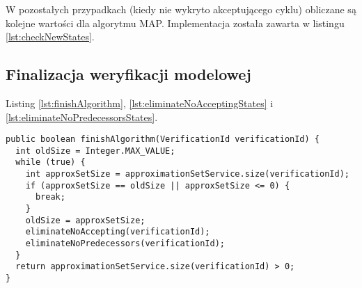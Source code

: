 W pozostałych przypadkach (kiedy nie wykryto akceptującego cyklu) obliczane są kolejne wartości dla algorytmu MAP. Implementacja została zawarta w listingu \ref{lst:checkNewStates}.


\subsection{Finalizacja weryfikacji modelowej}

Listing \ref{lst:finishAlgorithm}, \ref{lst:eliminateNoAcceptingStates} i \ref{lst:eliminateNoPredecessorsStates}.

\begin{minipage}{\linewidth}
\begin{lstlisting}[caption={Kod obsługujący algorytm w przypadku, gdy nie zakończy się wcześniej.},captionpos=b,label={lst:finishAlgorithm}]
public boolean finishAlgorithm(VerificationId verificationId) {
  int oldSize = Integer.MAX_VALUE;
  while (true) {
    int approxSetSize = approximationSetService.size(verificationId);
    if (approxSetSize == oldSize || approxSetSize <= 0) {
      break;
    }
    oldSize = approxSetSize;
    eliminateNoAccepting(verificationId);
    eliminateNoPredecessors(verificationId);
  }
  return approximationSetService.size(verificationId) > 0;
}
\end{lstlisting}
\end{minipage}

